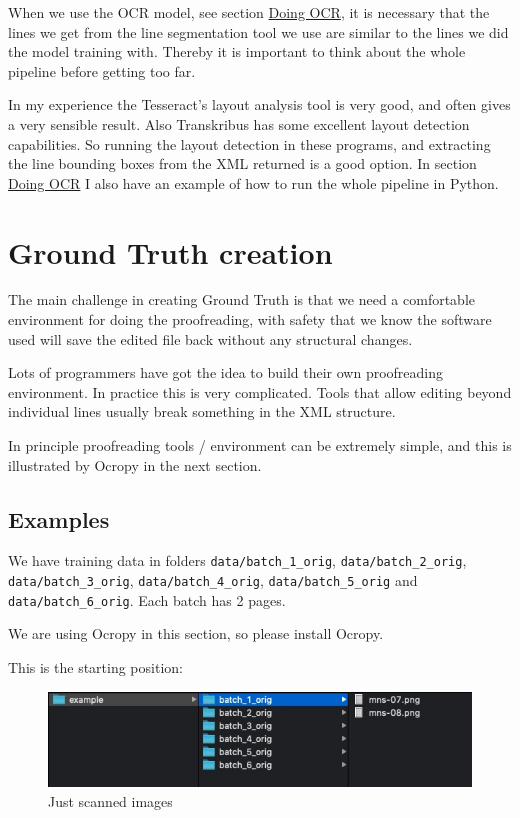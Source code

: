 \documentclass[]{book}
\begin{document}
When we use the OCR model, see section \href{./doing-ocr}{Doing OCR}, it is necessary that the lines we get from the line segmentation tool we use are similar to the lines we did the model training with. Thereby it is important to think about the whole pipeline before getting too far.

In my experience the Tesseract's layout analysis tool is very good, and often gives a very sensible result. Also Transkribus has some excellent layout detection capabilities. So running the layout detection in these programs, and extracting the line bounding boxes from the XML returned is a good option. In section \href{./doing-ocr}{Doing OCR} I also have an example of how to run the whole pipeline in Python.

\hypertarget{ground-truth}{%
\chapter{Ground Truth creation}\label{ground-truth}}

The main challenge in creating Ground Truth is that we need a comfortable environment for doing the proofreading, with safety that we know the software used will save the edited file back without any structural changes.

Lots of programmers have got the idea to build their own proofreading environment. In practice this is very complicated. Tools that allow editing beyond individual lines usually break something in the XML structure.

In principle proofreading tools / environment can be extremely simple, and this is illustrated by Ocropy in the next section.

\hypertarget{examples}{%
\section{Examples}\label{examples}}

We have training data in folders \texttt{data/batch\_1\_orig}, \texttt{data/batch\_2\_orig}, \texttt{data/batch\_3\_orig}, \texttt{data/batch\_4\_orig}, \texttt{data/batch\_5\_orig} and \texttt{data/batch\_6\_orig}. Each batch has 2 pages.

We are using Ocropy in this section, so please install Ocropy.

This is the starting position:

\begin{figure}
\centering
\includegraphics{./images/ocropy_starting_point.jpg}
\caption{Just scanned images}
\end{figure}
\end{document}
